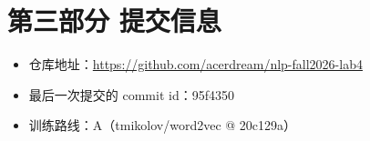 \documentclass[11pt,a4paper]{article}
\begin{document}
\section{第三部分 提交信息}

\begin{itemize}
  \item 仓库地址：\url{https://github.com/acerdream/nlp-fall2026-lab4}
  \item 最后一次提交的 commit id：95f4350
  \item 训练路线：A（tmikolov/word2vec @ 20c129a）
\end{itemize}



\end{document}
